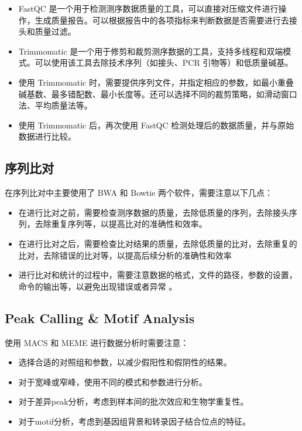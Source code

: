 \documentclass[UTF8]{ctexart}
\begin{document}
\begin{itemize}
	\item FastQC 是一个用于检测测序数据质量的工具，可以直接对压缩文件进行操作，生成质量报告。可以根据报告中的各项指标来判断数据是否需要进行去接头和质量过滤。
	\item Trimmomatic 是一个用于修剪和裁剪测序数据的工具，支持多线程和双端模式。可以使用该工具去除技术序列（如接头、PCR 引物等）和低质量碱基。
	\item 使用 Trimmomatic 时，需要提供序列文件，并指定相应的参数，如最小重叠碱基数、最多错配数、最小长度等。还可以选择不同的裁剪策略，如滑动窗口法、平均质量法等。
	\item 使用 Trimmomatic 后，再次使用 FastQC 检测处理后的数据质量，并与原始数据进行比较。
\end{itemize}

\subsection{序列比对}

在序列比对中主要使用了 BWA 和 Bowtie 两个软件，需要注意以下几点：

\begin{itemize}
	\item 在进行比对之前，需要检查测序数据的质量，去除低质量的序列，去除接头序列，去除重复序列等，以提高比对的准确性和效率。
	\item 在进行比对之后，需要检查比对结果的质量，去除低质量的比对，去除重复的比对，去除错误的比对等，以提高后续分析的准确性和效率
	\item 进行比对和统计的过程中，需要注意数据的格式，文件的路径，参数的设置，命令的输出等，以避免出现错误或者异常 。
\end{itemize}

\subsection{Peak Calling \& Motif Analysis}

使用 MACS 和 MEME 进行数据分析时需要注意：
\begin{itemize}
	\item 选择合适的对照组和参数，以减少假阳性和假阴性的结果。
	\item 对于宽峰或窄峰，使用不同的模式和参数进行分析。
	\item 对于差异peak分析，考虑到样本间的批次效应和生物学重复性。
	\item 对于motif分析，考虑到基因组背景和转录因子结合位点的特征。
\end{itemize}
\end{document}
